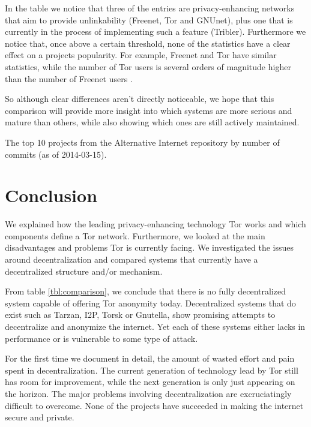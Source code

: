 \documentclass{article}
\begin{document}
	In the table we notice that three of the entries are privacy-enhancing networks that aim to provide unlinkability (Freenet, Tor and GNUnet), plus one that is currently in the process of implementing such a feature (Tribler). Furthermore we notice that, once above a certain threshold, none of the statistics have a clear effect on a projects popularity. For example, Freenet and Tor have similar statistics, while the number of Tor users \cite{tormetricsprojectwebsite} is several orders of magnitude higher than the number of Freenet users \cite{freenetstatistics}.
		
	So although clear differences aren't directly noticeable, we hope that this comparison will provide more insight into which systems are more serious and mature than others, while also showing which ones are still actively maintained.
		
	\begin{table}
		\centering
		
		\caption{The top 10 projects from the Alternative Internet repository by number of commits (as of 2014-03-15).}
		\label{tbl:altinternet}
	\end{table}
	
\section{Conclusion}
	\label{sec:conclusion}
		
	We explained how the leading privacy-enhancing technology Tor works and which components define a Tor network. Furthermore, we looked at the main disadvantages and problems Tor is currently facing. We investigated the issues around decentralization and compared systems that currently have a decentralized structure and/or mechanism.
		
	From table \ref{tbl:comparison}, we conclude that there is no fully decentralized system capable of offering Tor anonymity today. Decentralized systems that do exist such as Tarzan, I2P, Torsk or Gnutella, show promising attempts to decentralize and anonymize the internet. Yet each of these systems either lacks in performance or is vulnerable to some type of attack.
		
	For the first time we document in detail, the amount of wasted effort and pain spent in decentralization. The current generation of technology lead by Tor still has room for improvement, while the next generation is only just appearing on the horizon. The major problems involving decentralization are excruciatingly difficult to overcome. None of the projects have succeeded in making the internet secure and private.



\end{document}
